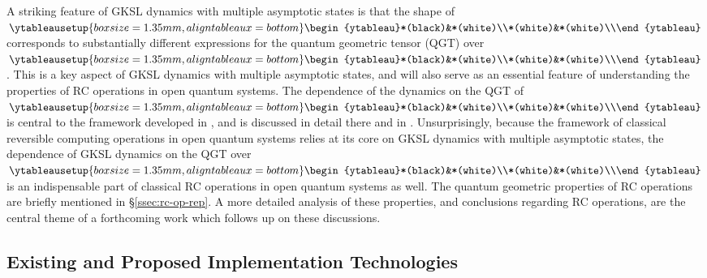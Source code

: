 \documentclass[preprints,article,accept,moreauthors,pdftex]{Definitions/mdpi}
\begin{document}
\begin{paracol}{2}
A striking feature of GKSL dynamics with multiple asymptotic states is that the shape of $\!\;\ytableausetup{boxsize = 1.35mm, aligntableaux = bottom}\begin{ytableau}*(black)&*(white)\\*(white)&*(white)\\\end{ytableau}\!\;$ corresponds to substantially different expressions for the quantum geometric tensor (QGT) over $\!\;\ytableausetup{boxsize = 1.35mm, aligntableaux = bottom}\begin{ytableau}*(black)&*(white)\\*(white)&*(white)\\\end{ytableau}\!\;$. This is a key aspect of GKSL dynamics with multiple asymptotic states, and will also serve as an essential feature of understanding the properties of RC operations in open quantum systems. The dependence of the dynamics on the QGT of $\!\;\ytableausetup{boxsize = 1.35mm, aligntableaux = bottom}\begin{ytableau}*(black)&*(white)\\*(white)&*(white)\\\end{ytableau}\!\;$ is central to the framework developed in \cite{ABFJ16}, and is discussed in detail there and in \cite{Albert18}. Unsurprisingly, because the framework of classical reversible computing operations in open quantum systems relies at its core on GKSL dynamics with multiple asymptotic states, the dependence of GKSL dynamics on the QGT over $\!\;\ytableausetup{boxsize = 1.35mm, aligntableaux = bottom}\begin{ytableau}*(black)&*(white)\\*(white)&*(white)\\\end{ytableau}\!\;$ is an indispensable part of classical RC operations in open quantum systems as well. The quantum geometric properties of RC operations are briefly mentioned in \S\ref{ssec:rc-op-rep}. A more detailed analysis of these properties, and conclusions regarding RC operations, are the central theme of a forthcoming work which follows up on these discussions.

\subsection{Existing and Proposed Implementation Technologies}
\label{ssec:tech}


\end{paracol}
\end{document}
